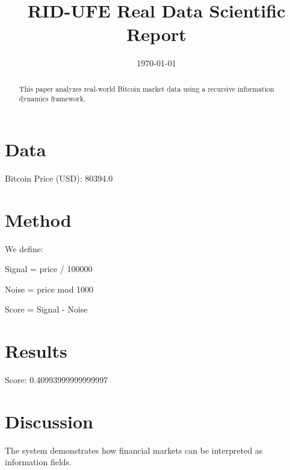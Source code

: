 \documentclass[10pt]{article}
\title{RID-UFE Real Data Scientific Report}
\date{\today}
\begin{document}
\maketitle

\begin{abstract}
This paper analyzes real-world Bitcoin market data
using a recursive information dynamics framework.
\end{abstract}

\section{Data}

Bitcoin Price (USD): 80394.0

\section{Method}

We define:

Signal = price / 100000

Noise = price mod 1000

Score = Signal - Noise

\section{Results}

Score: 0.40993999999999997

\section{Discussion}

The system demonstrates how financial markets
can be interpreted as information fields.
\end{document}
